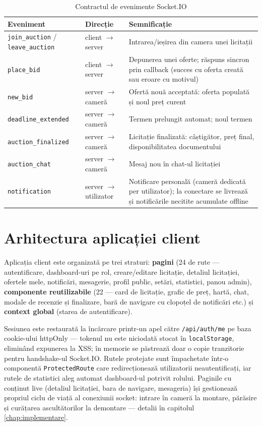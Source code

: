 \begin{table}[!ht]\small\linespread{1}
\centering
\caption{Contractul de evenimente Socket.IO}
\label{tab:evenimente-socket}
\begin{tabular}{l l >{\raggedright\arraybackslash}p{7.6cm}}
\toprule
\textbf{Eveniment} & \textbf{Direcție} & \textbf{Semnificație} \\
\midrule
\texttt{join\_auction} / \texttt{leave\_auction} & client $\to$ server & Intrarea/ieșirea din camera unei licitații \\
\texttt{place\_bid} & client $\to$ server & Depunerea unei oferte; răspuns sincron prin callback (succes cu oferta creată sau eroare cu motivul) \\
\texttt{new\_bid} & server $\to$ cameră & Ofertă nouă acceptată: oferta populată și noul preț curent \\
\texttt{deadline\_extended} & server $\to$ cameră & Termen prelungit automat; noul termen \\
\texttt{auction\_finalized} & server $\to$ cameră & Licitație finalizată: câștigător, preț final, disponibilitatea documentului \\
\texttt{auction\_chat} & server $\to$ cameră & Mesaj nou în chat-ul licitației \\
\texttt{notification} & server $\to$ utilizator & Notificare personală (cameră dedicată per utilizator); la conectare se livrează și notificările necitite acumulate offline \\
\bottomrule
\end{tabular}
\end{table}

\section{Arhitectura aplicației client}

Aplicația client este organizată pe trei straturi: \textbf{pagini} (24 de rute --- autentificare, dashboard-uri pe rol, creare/editare licitație, detaliul licitației, ofertele mele, notificări, mesagerie, profil public, setări, statistici, panou admin), \textbf{componente reutilizabile} (22 --- card de licitație, grafic de preț, hartă, chat, modale de recenzie și finalizare, bară de navigare cu clopoțel de notificări etc.) și \textbf{context global} (starea de autentificare).

Sesiunea este restaurată la încărcare printr-un apel către \texttt{/api/auth/me} pe baza cookie-ului httpOnly --- tokenul nu este niciodată stocat în \texttt{localStorage}, eliminând expunerea la XSS; în memorie se păstrează doar o copie tranzitorie pentru handshake-ul Socket.IO. Rutele protejate sunt împachetate într-o componentă \texttt{ProtectedRoute} care redirecționează utilizatorii neautentificați, iar rutele de statistici aleg automat dashboard-ul potrivit rolului. Paginile cu conținut live (detaliul licitației, bara de navigare, mesageria) își gestionează propriul ciclu de viață al conexiunii socket: intrare în cameră la montare, părăsire și curățarea ascultătorilor la demontare --- detalii în capitolul \ref{chap:implementare}.
